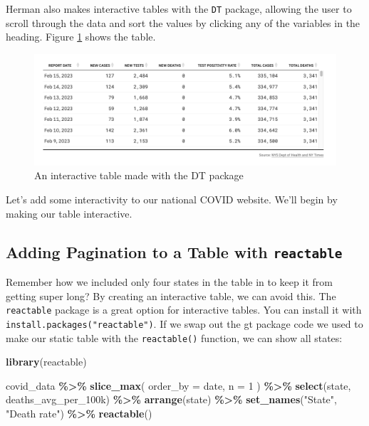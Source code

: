 \documentclass[
]{book}
\newenvironment{Shaded}{\begin{snugshade}}{\end{snugshade}}
\newcommand{\AttributeTok}[1]{\textcolor[rgb]{0.13,0.29,0.53}{#1}}
\newcommand{\DecValTok}[1]{\textcolor[rgb]{0.00,0.00,0.81}{#1}}
\newcommand{\FunctionTok}[1]{\textcolor[rgb]{0.13,0.29,0.53}{\textbf{#1}}}
\newcommand{\NormalTok}[1]{#1}
\newcommand{\SpecialCharTok}[1]{\textcolor[rgb]{0.81,0.36,0.00}{\textbf{#1}}}
\newcommand{\StringTok}[1]{\textcolor[rgb]{0.31,0.60,0.02}{#1}}
\begin{document}
Herman also makes interactive tables with the \texttt{DT} package, allowing the user to scroll through the data and sort the values by clicking any of the variables in the heading. Figure \ref{fig:dt-table} shows the table.

\begin{figure}
\includegraphics[width=1\linewidth]{assets/dt-table} \caption{An interactive table made with the DT package}\label{fig:dt-table}
\end{figure}

Let's add some interactivity to our national COVID website. We'll begin by making our table interactive.

\hypertarget{adding-pagination-to-a-table-with-reactable}{%
\subsection*{\texorpdfstring{Adding Pagination to a Table with \texttt{reactable}}{Adding Pagination to a Table with reactable}}\label{adding-pagination-to-a-table-with-reactable}}

Remember how we included only four states in the table in to keep it from getting super long? By creating an interactive table, we can avoid this. The \texttt{reactable} package is a great option for interactive tables. You can install it with \texttt{install.packages("reactable")}. If we swap out the gt package code we used to make our static table with the \texttt{reactable()} function, we can show all states:

\begin{Shaded}
\begin{Highlighting}[]
\FunctionTok{library}\NormalTok{(reactable)}

\NormalTok{covid\_data }\SpecialCharTok{\%\textgreater{}\%}
  \FunctionTok{slice\_max}\NormalTok{(}
    \AttributeTok{order\_by =}\NormalTok{ date,}
    \AttributeTok{n =} \DecValTok{1}
\NormalTok{  ) }\SpecialCharTok{\%\textgreater{}\%}
  \FunctionTok{select}\NormalTok{(state, deaths\_avg\_per\_100k) }\SpecialCharTok{\%\textgreater{}\%}
  \FunctionTok{arrange}\NormalTok{(state) }\SpecialCharTok{\%\textgreater{}\%}
  \FunctionTok{set\_names}\NormalTok{(}\StringTok{"State"}\NormalTok{, }\StringTok{"Death rate"}\NormalTok{) }\SpecialCharTok{\%\textgreater{}\%}
  \FunctionTok{reactable}\NormalTok{()}
\end{Highlighting}
\end{Shaded}
\end{document}
